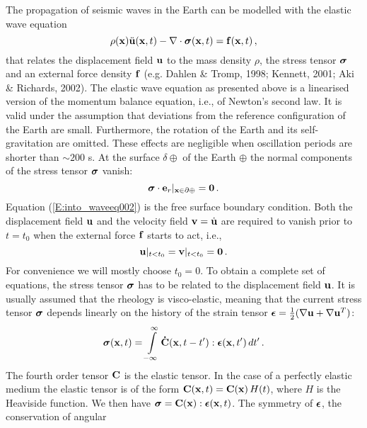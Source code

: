 The propagation of seismic waves in the Earth can be modelled with
the elastic wave equation
\begin{equation}\label{E:into_waveeq001}
\rho(\mathbf{x})\ddot{\mathbf{u}}(\mathbf{x}, t) - \nabla\cdot\boldsymbol{\sigma}(\mathbf{x}, t)
= \mathbf{f}(\mathbf{x}, t)\,,
\end{equation}
that relates the displacement field $\mathbf{u}$ to the mass density
$\rho$, the stress tensor $\boldsymbol{\sigma}$ and an external force density
$\mathbf{f}$ (e.g. Dahlen \& Tromp, 1998; Kennett, 2001; Aki \& Richards, 2002). The elastic wave
equation as presented above is a linearised version of the momentum
balance equation, i.e., of Newton's second law. It is valid under
the assumption that deviations from the reference configuration of
the Earth are small. Furthermore, the rotation of the Earth and its
self-gravitation are omitted. These effects are negligible when
oscillation periods are shorter than $\sim 200$ s. At the surface
$\delta\oplus$ of the Earth $\oplus$ the normal components of the
stress tensor $\boldsymbol{\sigma}$ vanish:
\begin{equation}\label{E:into_waveeq002}
\boldsymbol{\sigma}\cdot\mathbf{e}_r |_{\mathbf{x}\in\partial\oplus} = \mathbf{0}\,.
\end{equation}
Equation (\ref{E:into_waveeq002}) is the free surface boundary
condition. Both the displacement field $\mathbf{u}$ and the velocity
field $\mathbf{v}=\dot{\mathbf{u}}$ are required to vanish prior to $t=t_0$
when the external force $\mathbf{f}$ starts to act, i.e.,
\begin{equation}\label{E:into_waveeq003}
\mathbf{u}|_{t<t_0}=\mathbf{v}|_{t<t_0}=\mathbf{0}\,.
\end{equation}
For convenience we will mostly choose $t_0=0$. To obtain a complete
set of equations, the stress tensor $\boldsymbol{\sigma}$ has to be related
to the displacement field $\mathbf{u}$. It is usually assumed that the
rheology is visco-elastic, meaning that the current stress tensor
$\boldsymbol{\sigma}$ depends linearly on the history of the strain tensor
$\boldsymbol{\epsilon}=\frac{1}{2}(\nabla \mathbf{u} + \nabla \mathbf{u}^T)$:
\begin{equation}\label{E:intro_waveeq004}
\boldsymbol{\sigma}(\mathbf{x}, t) = \int\limits_{-\infty}^{\infty}
\mathbf{\dot{C}}(\mathbf{x}, t-t'):\boldsymbol{\epsilon}(\mathbf{x}, t')\,dt'\,.
\end{equation}
The fourth order tensor $\mathbf{C}$ is the elastic tensor. In the case
of a perfectly elastic medium the elastic tensor is of the form
$\mathbf{C}(\mathbf{x},t)=\mathbf{C}(\mathbf{x})\,H(t)$, where $H$ is the Heaviside
function. We then have $\boldsymbol{\sigma}=\mathbf{C}(\mathbf{x}):\boldsymbol{\epsilon}(\mathbf{x},
t)$. The symmetry of $\boldsymbol{\epsilon}$, the conservation of angular
